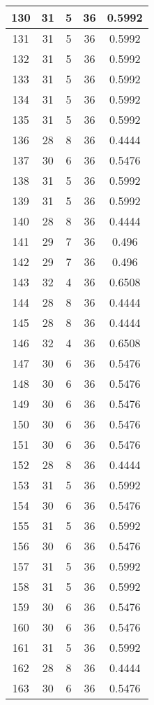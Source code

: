 \documentclass[letterpaper, 12pt]{article}
\begin{document}
\begin{longtable}{|c|c|c|c|c|}
\hline
130 & 31 & 5 & 36 & 0.5992 \\
\hline
131 & 31 & 5 & 36 & 0.5992 \\
\hline
132 & 31 & 5 & 36 & 0.5992 \\
\hline
133 & 31 & 5 & 36 & 0.5992 \\
\hline
134 & 31 & 5 & 36 & 0.5992 \\
\hline
135 & 31 & 5 & 36 & 0.5992 \\
\hline
136 & 28 & 8 & 36 & 0.4444 \\
\hline
137 & 30 & 6 & 36 & 0.5476 \\
\hline
138 & 31 & 5 & 36 & 0.5992 \\
\hline
139 & 31 & 5 & 36 & 0.5992 \\
\hline
140 & 28 & 8 & 36 & 0.4444 \\
\hline
141 & 29 & 7 & 36 & 0.496 \\
\hline
142 & 29 & 7 & 36 & 0.496 \\
\hline
143 & 32 & 4 & 36 & 0.6508 \\
\hline
144 & 28 & 8 & 36 & 0.4444 \\
\hline
145 & 28 & 8 & 36 & 0.4444 \\
\hline
146 & 32 & 4 & 36 & 0.6508 \\
\hline
147 & 30 & 6 & 36 & 0.5476 \\
\hline
148 & 30 & 6 & 36 & 0.5476 \\
\hline
149 & 30 & 6 & 36 & 0.5476 \\
\hline
150 & 30 & 6 & 36 & 0.5476 \\
\hline
151 & 30 & 6 & 36 & 0.5476 \\
\hline
152 & 28 & 8 & 36 & 0.4444 \\
\hline
153 & 31 & 5 & 36 & 0.5992 \\
\hline
154 & 30 & 6 & 36 & 0.5476 \\
\hline
155 & 31 & 5 & 36 & 0.5992 \\
\hline
156 & 30 & 6 & 36 & 0.5476 \\
\hline
157 & 31 & 5 & 36 & 0.5992 \\
\hline
158 & 31 & 5 & 36 & 0.5992 \\
\hline
159 & 30 & 6 & 36 & 0.5476 \\
\hline
160 & 30 & 6 & 36 & 0.5476 \\
\hline
161 & 31 & 5 & 36 & 0.5992 \\
\hline
162 & 28 & 8 & 36 & 0.4444 \\
\hline
163 & 30 & 6 & 36 & 0.5476 \\

\end{longtable}
\end{document}
